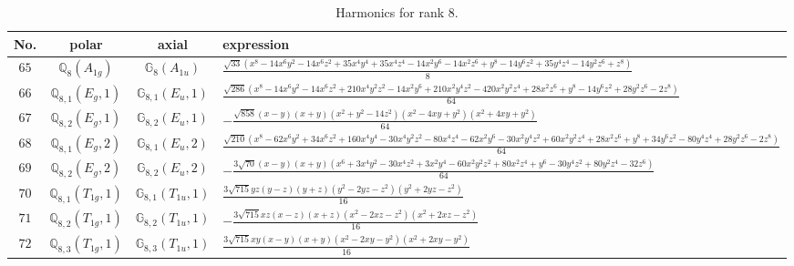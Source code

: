 \documentclass[fleqn,8pt,landscape]{jsarticle}
\begin{document}
\begin{table}[ht!]
\begin{center}
\caption{Harmonics for rank 8.}
\renewcommand{\arraystretch}{1.3}
\begin{tabular}{cccl} \hline \hline
No. & polar & axial & expression \\ \hline
$ 65 $ & $ \mathbb{Q}_{8}(A_{1g}) $ & $ \mathbb{G}_{8}(A_{1u}) $ & $ \frac{\sqrt{33} \left(x^{8} - 14 x^{6} y^{2} - 14 x^{6} z^{2} + 35 x^{4} y^{4} + 35 x^{4} z^{4} - 14 x^{2} y^{6} - 14 x^{2} z^{6} + y^{8} - 14 y^{6} z^{2} + 35 y^{4} z^{4} - 14 y^{2} z^{6} + z^{8}\right)}{8} $ \\
$ 66 $ & $ \mathbb{Q}_{8,1}(E_{g},1) $ & $ \mathbb{G}_{8,1}(E_{u},1) $ & $ \frac{\sqrt{286} \left(x^{8} - 14 x^{6} y^{2} - 14 x^{6} z^{2} + 210 x^{4} y^{2} z^{2} - 14 x^{2} y^{6} + 210 x^{2} y^{4} z^{2} - 420 x^{2} y^{2} z^{4} + 28 x^{2} z^{6} + y^{8} - 14 y^{6} z^{2} + 28 y^{2} z^{6} - 2 z^{8}\right)}{64} $ \\
$ 67 $ & $ \mathbb{Q}_{8,2}(E_{g},1) $ & $ \mathbb{G}_{8,2}(E_{u},1) $ & $ - \frac{\sqrt{858} \left(x - y\right) \left(x + y\right) \left(x^{2} + y^{2} - 14 z^{2}\right) \left(x^{2} - 4 x y + y^{2}\right) \left(x^{2} + 4 x y + y^{2}\right)}{64} $ \\
$ 68 $ & $ \mathbb{Q}_{8,1}(E_{g},2) $ & $ \mathbb{G}_{8,1}(E_{u},2) $ & $ \frac{\sqrt{210} \left(x^{8} - 62 x^{6} y^{2} + 34 x^{6} z^{2} + 160 x^{4} y^{4} - 30 x^{4} y^{2} z^{2} - 80 x^{4} z^{4} - 62 x^{2} y^{6} - 30 x^{2} y^{4} z^{2} + 60 x^{2} y^{2} z^{4} + 28 x^{2} z^{6} + y^{8} + 34 y^{6} z^{2} - 80 y^{4} z^{4} + 28 y^{2} z^{6} - 2 z^{8}\right)}{64} $ \\
$ 69 $ & $ \mathbb{Q}_{8,2}(E_{g},2) $ & $ \mathbb{G}_{8,2}(E_{u},2) $ & $ - \frac{3 \sqrt{70} \left(x - y\right) \left(x + y\right) \left(x^{6} + 3 x^{4} y^{2} - 30 x^{4} z^{2} + 3 x^{2} y^{4} - 60 x^{2} y^{2} z^{2} + 80 x^{2} z^{4} + y^{6} - 30 y^{4} z^{2} + 80 y^{2} z^{4} - 32 z^{6}\right)}{64} $ \\
$ 70 $ & $ \mathbb{Q}_{8,1}(T_{1g},1) $ & $ \mathbb{G}_{8,1}(T_{1u},1) $ & $ \frac{3 \sqrt{715} y z \left(y - z\right) \left(y + z\right) \left(y^{2} - 2 y z - z^{2}\right) \left(y^{2} + 2 y z - z^{2}\right)}{16} $ \\
$ 71 $ & $ \mathbb{Q}_{8,2}(T_{1g},1) $ & $ \mathbb{G}_{8,2}(T_{1u},1) $ & $ - \frac{3 \sqrt{715} x z \left(x - z\right) \left(x + z\right) \left(x^{2} - 2 x z - z^{2}\right) \left(x^{2} + 2 x z - z^{2}\right)}{16} $ \\
$ 72 $ & $ \mathbb{Q}_{8,3}(T_{1g},1) $ & $ \mathbb{G}_{8,3}(T_{1u},1) $ & $ \frac{3 \sqrt{715} x y \left(x - y\right) \left(x + y\right) \left(x^{2} - 2 x y - y^{2}\right) \left(x^{2} + 2 x y - y^{2}\right)}{16} $ \\

\end{tabular}
\end{center}
\end{table}
\end{document}
